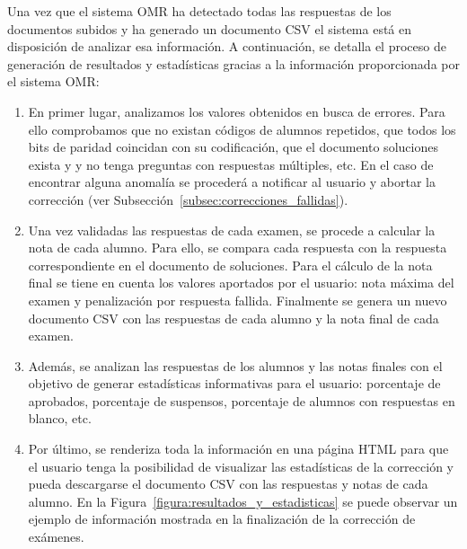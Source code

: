 \documentclass[a4paper, 12pt]{book}
\begin{document}
Una vez que el sistema OMR ha detectado todas las respuestas de los documentos subidos
y ha generado un documento CSV el sistema está en disposición
de analizar esa información. A continuación, se detalla el proceso de generación de
resultados y estadísticas gracias a la información proporcionada por el sistema OMR:

\begin{enumerate}
  \item En primer lugar, analizamos los valores obtenidos en busca de errores. Para ello
  comprobamos que no existan códigos de alumnos repetidos, que todos los bits de 
  paridad coincidan con su codificación, que el documento soluciones exista y y no
  tenga preguntas con respuestas múltiples, etc. En el caso de encontrar alguna
  anomalía se procederá a notificar al usuario y abortar la corrección
  (ver Subsección~\ref{subsec:correcciones_fallidas}).
  \item Una vez validadas las respuestas de cada examen, se procede a calcular la nota
  de cada alumno. Para ello, se compara cada respuesta con la respuesta correspondiente
  en el documento de soluciones. Para el cálculo de la nota final se tiene en cuenta
  los valores aportados por el usuario: nota máxima del examen y penalización por
  respuesta fallida. Finalmente se genera un nuevo documento CSV con las respuestas
  de cada alumno y la nota final de cada examen.
  \item Además, se analizan las respuestas de los alumnos y las notas finales
  con el objetivo de generar estadísticas informativas para el usuario: porcentaje
  de aprobados, porcentaje de suspensos, porcentaje de alumnos con respuestas en
  blanco, etc.
  \item Por último, se renderiza toda la información en una página HTML para que
  el usuario tenga la posibilidad de visualizar las estadísticas de la corrección
  y pueda descargarse el documento CSV con las respuestas y notas de cada alumno.
  En la Figura~\ref{figura:resultados_y_estadisticas} se puede observar
  un ejemplo de información mostrada
  en la finalización de la corrección de exámenes.
\end{enumerate}
\end{document}
